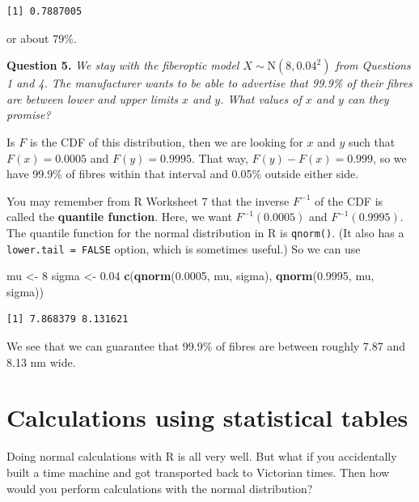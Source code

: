 \documentclass[
  a4paper,
]{book}
\newenvironment{Shaded}{\begin{snugshade}}{\end{snugshade}}
\newcommand{\DecValTok}[1]{\textcolor[rgb]{0.00,0.00,0.81}{#1}}
\newcommand{\FloatTok}[1]{\textcolor[rgb]{0.00,0.00,0.81}{#1}}
\newcommand{\FunctionTok}[1]{\textcolor[rgb]{0.13,0.29,0.53}{\textbf{#1}}}
\newcommand{\NormalTok}[1]{#1}
\newcommand{\OtherTok}[1]{\textcolor[rgb]{0.56,0.35,0.01}{#1}}
\theoremstyle{definition}
\theoremstyle{definition}
\theoremstyle{definition}
\theoremstyle{definition}
\theoremstyle{remark}
\begin{document}
\begin{verbatim}
[1] 0.7887005
\end{verbatim}

or about 79\%.

\textbf{Question 5.} \emph{We stay with the fiberoptic model \(X \sim \mathrm{N}(8, 0.04^2)\) from Questions 1 and 4. The manufacturer wants to be able to advertise that 99.9\% of their fibres are between lower and upper limits \(x\) and \(y\). What values of \(x\) and \(y\) can they promise?}

Is \(F\) is the CDF of this distribution, then we are looking for \(x\) and \(y\) such that \(F(x) = 0.0005\) and \(F(y) = 0.9995\). That way, \(F(y) - F(x) = 0.999\), so we have 99.9\% of fibres within that interval and 0.05\% outside either side.

You may remember from R Worksheet 7 that the inverse \(F^{-1}\) of the CDF is called the \textbf{quantile function}. Here, we want \(F^{-1}(0.0005)\) and \(F^{-1}(0.9995)\). The quantile function for the normal distribution in R is \texttt{qnorm()}. (It also has a \texttt{lower.tail\ =\ FALSE} option, which is sometimes useful.) So we can use

\begin{Shaded}
\begin{Highlighting}[]
\NormalTok{mu }\OtherTok{\textless{}{-}} \DecValTok{8}
\NormalTok{sigma }\OtherTok{\textless{}{-}} \FloatTok{0.04}
\FunctionTok{c}\NormalTok{(}\FunctionTok{qnorm}\NormalTok{(}\FloatTok{0.0005}\NormalTok{, mu, sigma), }\FunctionTok{qnorm}\NormalTok{(}\FloatTok{0.9995}\NormalTok{, mu, sigma))}
\end{Highlighting}
\end{Shaded}

\begin{verbatim}
[1] 7.868379 8.131621
\end{verbatim}

We see that we can guarantee that 99.9\% of fibres are between roughly 7.87 and 8.13 nm wide.

\hypertarget{normal-tables}{%
\section{Calculations using statistical tables}\label{normal-tables}}

Doing normal calculations with R is all very well. But what if you accidentally built a time machine and got transported back to Victorian times. Then how would you perform calculations with the normal distribution?
\end{document}
